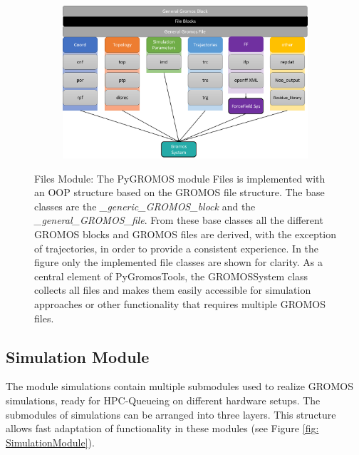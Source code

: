 \begin{figure}[h]
    \centering
    \begin{subfigure}{1\textwidth}
        \includegraphics[width=\textwidth]{fig/implementation/Files.png} 
        \caption{}
        \label{subFig: FilesinModule}
    \end{subfigure}
    \caption{Files Module:  The PyGROMOS module Files is implemented with an OOP structure based on the GROMOS file structure. The base classes are the \textit{\_generic\_GROMOS\_block} and the \textit{\_general\_GROMOS\_file}. From these base classes all the different GROMOS blocks and GROMOS files are derived, with the exception of trajectories, in order to provide a consistent experience.
    In the figure only the implemented file classes are shown for clarity. As a central element of PyGromosTools, the GROMOSSystem class collects all files and makes them easily accessible for simulation approaches or other functionality that requires multiple GROMOS files.
    }
    \label{fig: FileModule}
\end{figure}

\subsection{Simulation Module}
The module simulations contain multiple submodules used to realize GROMOS simulations, ready for HPC-Queueing on different hardware setups. The submodules of simulations can be arranged into three layers. This structure allows fast adaptation of functionality in these modules (see Figure \ref{fig: SimulationModule}).

